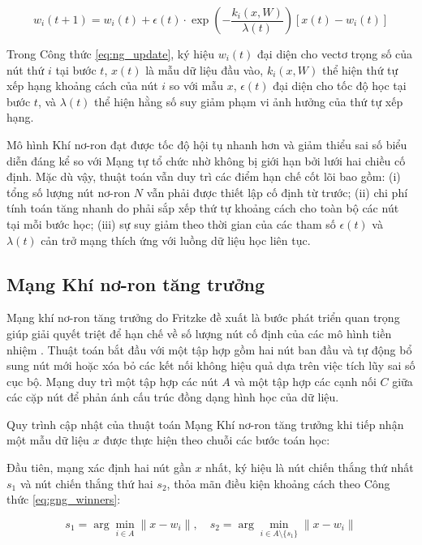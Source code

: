 \begin{equation}
w_i(t+1) = w_i(t) + \epsilon(t) \cdot \exp\left( -\frac{k_i(x, W)}{\lambda(t)} \right) \left[ x(t) - w_i(t) \right]
\label{eq:ng_update}
\end{equation}

Trong Công thức \ref{eq:ng_update}, ký hiệu $w_i(t)$ đại diện cho vectơ trọng số của nút thứ $i$ tại bước $t$, $x(t)$ là mẫu dữ liệu đầu vào, $k_i(x, W)$ thể hiện thứ tự xếp hạng khoảng cách của nút $i$ so với mẫu $x$, $\epsilon(t)$ đại diện cho tốc độ học tại bước $t$, và $\lambda(t)$ thể hiện hằng số suy giảm phạm vi ảnh hưởng của thứ tự xếp hạng.

Mô hình Khí nơ-ron đạt được tốc độ hội tụ nhanh hơn và giảm thiểu sai số biểu diễn đáng kể so với Mạng tự tổ chức nhờ không bị giới hạn bởi lưới hai chiều cố định. Mặc dù vậy, thuật toán vẫn duy trì các điểm hạn chế cốt lõi bao gồm:
(i) tổng số lượng nút nơ-ron $N$ vẫn phải được thiết lập cố định từ trước;
(ii) chi phí tính toán tăng nhanh do phải sắp xếp thứ tự khoảng cách cho toàn bộ các nút tại mỗi bước học;
(iii) sự suy giảm theo thời gian của các tham số $\epsilon(t)$ và $\lambda(t)$ cản trở mạng thích ứng với luồng dữ liệu học liên tục.

\subsection{Mạng Khí nơ-ron tăng trưởng}

Mạng khí nơ-ron tăng trưởng do Fritzke đề xuất là bước phát triển quan trọng giúp giải quyết triệt để hạn chế về số lượng nút cố định của các mô hình tiền nhiệm \cite{fritzke1995growing}. Thuật toán bắt đầu với một tập hợp gồm hai nút ban đầu và tự động bổ sung nút mới hoặc xóa bỏ các kết nối không hiệu quả dựa trên việc tích lũy sai số cục bộ. Mạng duy trì một tập hợp các nút $A$ và một tập hợp các cạnh nối $C$ giữa các cặp nút để phản ánh cấu trúc đồng dạng hình học của dữ liệu.

Quy trình cập nhật của thuật toán Mạng Khí nơ-ron tăng trưởng khi tiếp nhận một mẫu dữ liệu $x$ được thực hiện theo chuỗi các bước toán học:

Đầu tiên, mạng xác định hai nút gần $x$ nhất, ký hiệu là nút chiến thắng thứ nhất $s_1$ và nút chiến thắng thứ hai $s_2$, thỏa mãn điều kiện khoảng cách theo Công thức \ref{eq:gng_winners}:

\begin{equation}
s_1 = \arg\min_{i \in A} \|x - w_i\|, \quad s_2 = \arg\min_{i \in A \setminus \{s_1\}} \|x - w_i\|
\label{eq:gng_winners}
\end{equation}

